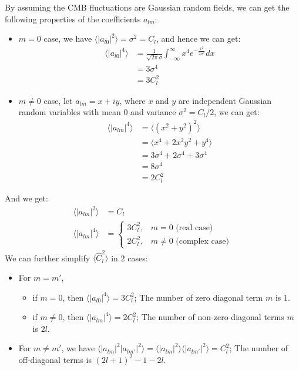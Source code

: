 \begin{foundation}
    \pagebreak
    By assuming the CMB fluctuations are Gaussian random fields, we can get the following properties of the coefficients $a_{lm}$:
    \begin{itemize}
        \item $m = 0$ case, we have $\langle |a_{l0}|^2 \rangle = \sigma^2 = C_l$, and hence we can get: 
            \begin{align*}
                \langle |a_{l0}|^4 \rangle &= \frac{1}{\sqrt{2\pi} \sigma} \int_{-\infty}^{\infty} x^4 e^{-\frac{x^2}{2\sigma^2}} dx \\
                &= 3 \sigma^4 \\
                &= 3 C_l^2
            \end{align*}
        \item $m \neq 0$ case, let $a_{lm} = x + i y$, where $x$ and $y$ are independent Gaussian random variables with mean 0 and variance $\sigma^2 = C_l/2$, we can get:
            \begin{align*}
                \langle |a_{lm}|^4 \rangle &= \langle (x^2 + y^2)^2 \rangle \\
                &= \langle x^4 + 2 x^2 y^2 + y^4 \rangle \\
                &= 3 \sigma^4 + 2 \sigma^4 + 3 \sigma^4 \\
                &= 8 \sigma^4 \\
                &= 2 C_l^2
            \end{align*}
    \end{itemize}
    And we get:
    \begin{align*}
        \langle |a_{lm}|^2 \rangle &= C_l \\
        \langle |a_{lm}|^4 \rangle &= \begin{cases}
            3 C_l^2, & m = 0 \text{ (real case)} \\
            2 C_l^2, & m \neq 0 \text{ (complex case)}
        \end{cases}
    \end{align*}
    We can further simplify $\langle \hat{C}_l^2 \rangle$ in 2 cases:
    \begin{itemize}
        \item For $m = m'$,
        \begin{itemize}
            \item if $m = 0$, then $\langle |a_{l0}|^4 \rangle = 3 C_l^2$; The number of zero diagonal term $m$ is 1.
            \item if $m \neq 0$, then $\langle |a_{lm}|^4 \rangle = 2 C_l^2$; The number of non-zero diagonal terms $m$ is $2l$.
        \end{itemize}
        \item For $m \neq m'$, we have $\langle |a_{lm}|^2 |a_{lm'}|^2 \rangle = \langle |a_{lm}|^2 \rangle \langle |a_{lm'}|^2 \rangle = C_l^2$; The number of off-diagonal terms is $(2l + 1)^2 - 1 - 2l$.
    \end{itemize} \\


\end{foundation}
